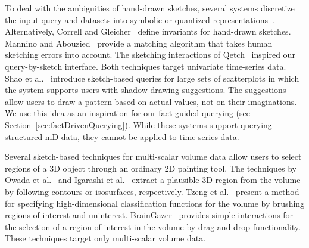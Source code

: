 To deal with the ambiguities of hand-drawn sketches, several systems discretize the input query and datasets into symbolic or quantized representations~\cite{Muthumanickam2016,ruta2019sax}.
%
Alternatively, Correll and Gleicher~\cite{Correll2016} define invariants for hand-drawn sketches. %
Mannino and Abouzied~\cite{Mannino2018} provide a matching algorithm that takes human sketching errors into account.
The sketching interactions of Qetch~\cite{Mannino2018} inspired our query-by-sketch interface.
Both techniques target univariate time-series data.
%
Shao et al.~\cite{Shao2014} introduce sketch-based queries for large sets of scatterplots
in which the system supports users with shadow-drawing suggestions. %
The suggestions allow users to draw a pattern based on actual values, not on their imaginations.
We use this idea as an inspiration for our fact-guided querying (see Section~\ref{sec:factDrivenQuerying}).
While these systems support querying structured mD data, they cannot be applied to time-series data.

Several sketch-based techniques for multi-scalar volume data allow users to select regions of a 3D object through an ordinary 2D painting tool.
The techniques by Owada et al.~\cite{Owada2005} and Igarashi et al.~\cite{Igarashi2016} extract a plausible 3D region from the volume
by following contours or isosurfaces, respectively.
Tzeng et al.~\cite{Tzeng2003} present a method for specifying high-dimensional classification functions for the volume
by brushing regions of interest and uninterest. %
BrainGazer~\cite{Bruckner2009} provides simple interactions for the selection of a region of interest in the volume
by drag-and-drop functionality.
These techniques target only multi-scalar volume data. 


